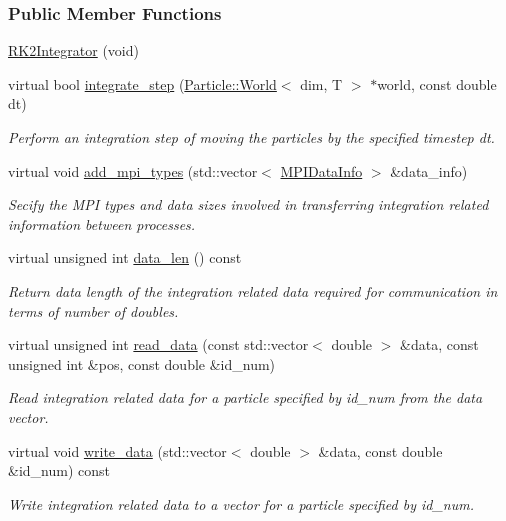 \subsubsection*{Public Member Functions}
\begin{DoxyCompactItemize}
\item 
\hyperlink{classps__mmm_1_1_particle_1_1_integrator_1_1_r_k2_integrator_ac34a83951d1d6eacee9637438e141e84}{R\+K2\+Integrator} (void)
\item 
virtual bool \hyperlink{classps__mmm_1_1_particle_1_1_integrator_1_1_r_k2_integrator_af5c9d0b30c061017e5afbb2719060313}{integrate\+\_\+step} (\hyperlink{classps__mmm_1_1_particle_1_1_world}{Particle\+::\+World}$<$ dim, T $>$ $\ast$world, const double dt)
\begin{DoxyCompactList}\small\item\em Perform an integration step of moving the particles by the specified timestep dt. \end{DoxyCompactList}\item 
virtual void \hyperlink{classps__mmm_1_1_particle_1_1_integrator_1_1_r_k2_integrator_ac612c8ef6762663a5e4bc111c5116290}{add\+\_\+mpi\+\_\+types} (std\+::vector$<$ \hyperlink{classps__mmm_1_1_particle_1_1_m_p_i_data_info}{M\+P\+I\+Data\+Info} $>$ \&data\+\_\+info)
\begin{DoxyCompactList}\small\item\em Secify the M\+P\+I types and data sizes involved in transferring integration related information between processes. \end{DoxyCompactList}\item 
virtual unsigned int \hyperlink{classps__mmm_1_1_particle_1_1_integrator_1_1_r_k2_integrator_a48882ad43f5b0bda026be9f3813f1155}{data\+\_\+len} () const 
\begin{DoxyCompactList}\small\item\em Return data length of the integration related data required for communication in terms of number of doubles. \end{DoxyCompactList}\item 
virtual unsigned int \hyperlink{classps__mmm_1_1_particle_1_1_integrator_1_1_r_k2_integrator_aefa62be524024d365dbd25964dca98eb}{read\+\_\+data} (const std\+::vector$<$ double $>$ \&data, const unsigned int \&pos, const double \&id\+\_\+num)
\begin{DoxyCompactList}\small\item\em Read integration related data for a particle specified by id\+\_\+num from the data vector. \end{DoxyCompactList}\item 
virtual void \hyperlink{classps__mmm_1_1_particle_1_1_integrator_1_1_r_k2_integrator_af9967cb9fa46f5ab1378796c7b2e80b5}{write\+\_\+data} (std\+::vector$<$ double $>$ \&data, const double \&id\+\_\+num) const 
\begin{DoxyCompactList}\small\item\em Write integration related data to a vector for a particle specified by id\+\_\+num. \end{DoxyCompactList}\end{DoxyCompactItemize}


